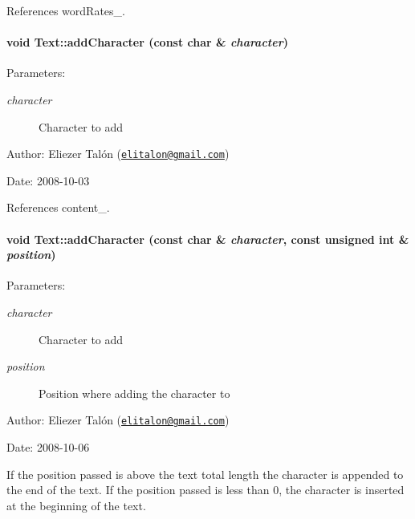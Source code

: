 References wordRates\_\-.\hypertarget{class_text_6e6da63c90af68639adc7dd1336f6bf9}{
\paragraph[addCharacter]{\setlength{\rightskip}{0pt plus 5cm}void Text::addCharacter (const char \& {\em character})}\hfill}
\label{class_text_6e6da63c90af68639adc7dd1336f6bf9}


\begin{Desc}
\item[Parameters:]
\begin{description}
\item[{\em character}]Character to add\end{description}
\end{Desc}
\begin{Desc}
\item[Author:]Eliezer Talón (\href{mailto:elitalon@gmail.com}{\tt elitalon@gmail.com}) \end{Desc}
\begin{Desc}
\item[Date:]2008-10-03 \end{Desc}


References content\_\-.\hypertarget{class_text_fdd11ad0c90ca483d4cff3d74a64da9e}{
\paragraph[addCharacter]{\setlength{\rightskip}{0pt plus 5cm}void Text::addCharacter (const char \& {\em character}, \/  const unsigned int \& {\em position})}\hfill}
\label{class_text_fdd11ad0c90ca483d4cff3d74a64da9e}


\begin{Desc}
\item[Parameters:]
\begin{description}
\item[{\em character}]Character to add \item[{\em position}]Position where adding the character to\end{description}
\end{Desc}
\begin{Desc}
\item[Author:]Eliezer Talón (\href{mailto:elitalon@gmail.com}{\tt elitalon@gmail.com}) \end{Desc}
\begin{Desc}
\item[Date:]2008-10-06\end{Desc}
If the position passed is above the text total length the character is appended to the end of the text. If the position passed is less than 0, the character is inserted at the beginning of the text. 

